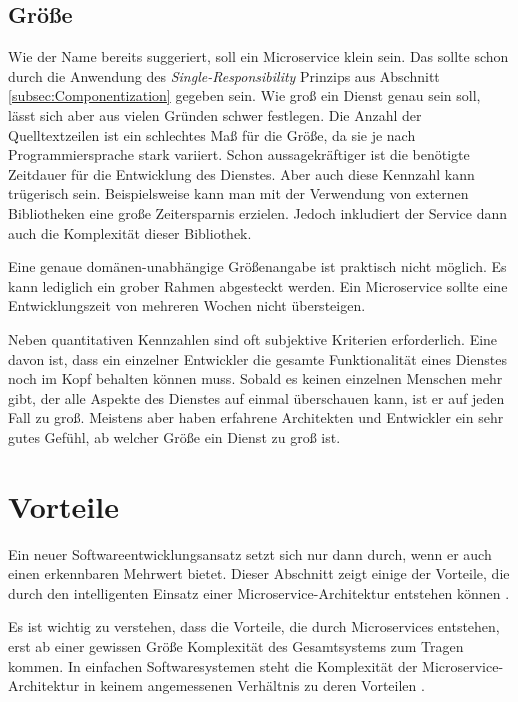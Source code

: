 \subsection{Größe}

Wie der Name bereits suggeriert, soll ein Microservice klein sein. Das sollte schon durch die Anwendung des \textit{Single-Responsibility} Prinzips aus Abschnitt \ref{subsec:Componentization} gegeben sein. Wie groß ein Dienst genau sein soll, lässt sich aber aus vielen Gründen schwer festlegen. Die Anzahl der Quelltextzeilen ist ein schlechtes Maß für die Größe, da sie je nach Programmiersprache stark variiert. Schon aussagekräftiger ist die benötigte Zeitdauer für die Entwicklung des Dienstes. Aber auch diese Kennzahl kann trügerisch sein. Beispielsweise kann man mit der Verwendung von externen Bibliotheken eine große Zeitersparnis erzielen. Jedoch inkludiert der Service dann auch die Komplexität dieser Bibliothek.

Eine genaue domänen-unabhängige Größenangabe ist praktisch nicht möglich. Es kann lediglich ein grober Rahmen abgesteckt werden. Ein Microservice sollte eine Entwicklungszeit von mehreren Wochen nicht übersteigen.

Neben quantitativen Kennzahlen sind oft subjektive Kriterien erforderlich. Eine davon ist, dass ein einzelner Entwickler die gesamte Funktionalität eines Dienstes noch im Kopf behalten können muss. Sobald es keinen einzelnen Menschen mehr gibt, der alle Aspekte des Dienstes auf einmal überschauen kann, ist er auf jeden Fall zu groß. Meistens aber haben erfahrene Architekten und Entwickler ein sehr gutes Gefühl, ab welcher Größe ein Dienst zu groß ist.

\section{Vorteile}

Ein neuer Softwareentwicklungsansatz setzt sich nur dann durch, wenn er auch einen erkennbaren Mehrwert bietet. Dieser Abschnitt zeigt einige der Vorteile, die durch den intelligenten Einsatz einer Microservice-Architektur entstehen können \cite{fowlerMSTradeOffs,newman2015building}.

Es ist wichtig zu verstehen, dass die Vorteile, die durch Microservices entstehen, erst ab einer gewissen Größe \bzw Komplexität des Gesamtsystems zum Tragen kommen. In einfachen Softwaresystemen steht die Komplexität der Microservice-Architektur in keinem angemessenen Verhältnis zu deren Vorteilen \cite{fowlerMSPremium}.

